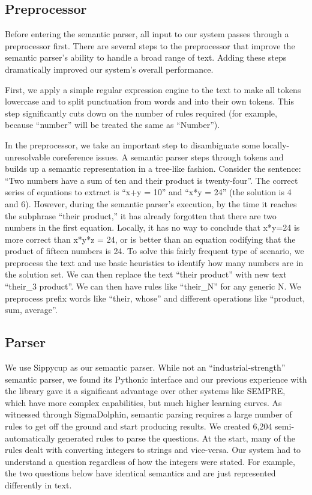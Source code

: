 \documentclass[11pt]{article}
\begin{document}
\subsection{Preprocessor}

Before entering the semantic parser, all input to our system passes through a preprocessor first. There are several steps to the preprocessor that improve the semantic parser's ability to handle a broad range of text. Adding these steps dramatically improved our system's overall performance.

First, we apply a simple regular expression engine to the text to make all tokens lowercase and to split punctuation from words and into their own tokens. This step significantly cuts down on the number of rules required (for example, because ``number'' will be treated the same as ``Number'').

In the preprocessor, we take an important step to disambiguate some locally-unresolvable coreference issues. A semantic parser steps through tokens and builds up a semantic representation in a tree-like fashion. Consider the sentence: ``Two numbers have a sum of ten and their product is twenty-four''. The correct series of equations to extract is ``x+y = 10'' and ``x*y = 24'' (the solution is 4 and 6). However, during the semantic parser's execution, by the time it reaches the subphrase ``their product,'' it has already forgotten that there are two numbers in the first equation. Locally, it has no way to conclude that x*y=24 is more correct than x*y*z = 24, or is better than an equation codifying that the product of fifteen numbers is 24. To solve this fairly frequent type of scenario, we preprocess the text and use basic heuristics to identify how many numbers are in the solution set. We can then replace the text ``their product'' with new text ``their\_3 product''. We can then have rules like ``their\_N'' for any generic N. We preprocess prefix words like ``their, whose'' and different operations like ``product, sum, average''.


\subsection{Parser}

We use Sippycup as our semantic parser. While not an ``industrial-strength'' semantic parser, we found its Pythonic interface and our previous experience with the library gave it a significant advantage over other systems like SEMPRE, which have more complex capabilities, but much higher learning curves. As witnessed through SigmaDolphin, semantic parsing requires a large number of rules to get off the ground and start producing results. We created 6,204 semi-automatically generated rules to parse the questions. At the start, many of the rules dealt with converting integers to strings and vice-versa. Our system had to understand a question regardless of how the integers were stated. For example, the two questions below have identical semantics and are just represented differently in text.
\end{document}
